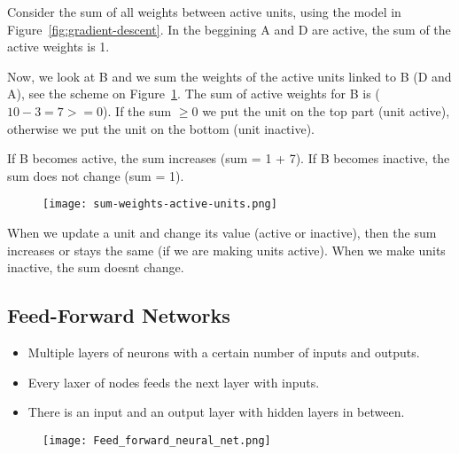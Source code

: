 \documentclass[main]{subfiles}
\begin{document}
Consider the sum of all weights between active units, using the model in Figure~\ref{fig:gradient-descent}. In the beggining A and D are active, the sum of the active weights is 1.

Now, we look at B and we sum the weights of the active units linked to B (D and A), see the scheme on Figure~\ref{fig:sum-weights}. The sum of active weights for B is ($10 - 3 = 7 >= 0$). If the sum $\geq 0$ we put the unit on the top part (unit active), otherwise we put the unit on the bottom (unit inactive).

If B becomes active, the sum increases (sum = 1 + 7). If B becomes inactive, the sum does not change (sum = 1).

\begin{figure}[H]
	\centering
	\texttt{[image: sum-weights-active-units.png]}
	\label{fig:sum-weights}
\end{figure}

When we update a unit and change its value (active or inactive), then the sum increases or stays the same (if we are making units active). When we make units inactive, the sum doesnt change.

\subsection{Feed-Forward Networks}
\begin{itemize}[noitemsep,nolistsep]
	\item Multiple layers of neurons with a certain number of inputs and outputs.
	\item Every laxer of nodes feeds the next layer with inputs.
	\item There is an input and an output layer with hidden layers in between.
\end{itemize}
\begin{figure}[H]
	\centering
	\texttt{[image: Feed\_forward\_neural\_net.png]}
\end{figure}
\end{document}
